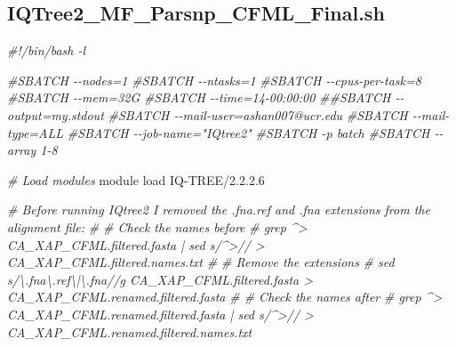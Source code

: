 \documentclass[
]{book}
\newenvironment{Shaded}{\begin{snugshade}}{\end{snugshade}}
\newcommand{\CommentTok}[1]{\textcolor[rgb]{0.56,0.35,0.01}{\textit{#1}}}
\newcommand{\ExtensionTok}[1]{#1}
\newcommand{\NormalTok}[1]{#1}
\begin{document}
\subsection{IQTree2\_MF\_Parsnp\_CFML\_Final.sh}\label{MFCFML-script}

\begin{Shaded}
\begin{Highlighting}[]
\CommentTok{\#!/bin/bash {-}l}

\CommentTok{\#SBATCH {-}{-}nodes=1}
\CommentTok{\#SBATCH {-}{-}ntasks=1}
\CommentTok{\#SBATCH {-}{-}cpus{-}per{-}task=8}
\CommentTok{\#SBATCH {-}{-}mem=32G}
\CommentTok{\#SBATCH {-}{-}time=14{-}00:00:00}
\CommentTok{\#\#SBATCH {-}{-}output=my.stdout}
\CommentTok{\#SBATCH {-}{-}mail{-}user=ashan007@ucr.edu}
\CommentTok{\#SBATCH {-}{-}mail{-}type=ALL}
\CommentTok{\#SBATCH {-}{-}job{-}name="IQtree2"}
\CommentTok{\#SBATCH {-}p batch}
\CommentTok{\#SBATCH {-}{-}array 1{-}8}


\CommentTok{\# Load modules}
\ExtensionTok{module}\NormalTok{ load IQ{-}TREE/2.2.2.6}

\CommentTok{\# Before running IQtree2 I removed the .fna.ref and .fna extensions from the alignment file:}
\CommentTok{\# \# Check the names before}
\CommentTok{\# grep \textquotesingle{}\^{}\textgreater{}\textquotesingle{} CA\_XAP\_CFML.filtered.fasta | sed \textquotesingle{}s/\^{}\textgreater{}//\textquotesingle{} \textgreater{} CA\_XAP\_CFML.filtered.names.txt }
\CommentTok{\# \# Remove the extensions}
\CommentTok{\# sed \textquotesingle{}s/\textbackslash{}.fna\textbackslash{}.ref\textbackslash{}|\textbackslash{}.fna//g\textquotesingle{} CA\_XAP\_CFML.filtered.fasta \textgreater{} CA\_XAP\_CFML.renamed.filtered.fasta}
\CommentTok{\# \# Check the names after}
\CommentTok{\# grep \textquotesingle{}\^{}\textgreater{}\textquotesingle{} CA\_XAP\_CFML.renamed.filtered.fasta | sed \textquotesingle{}s/\^{}\textgreater{}//\textquotesingle{} \textgreater{} CA\_XAP\_CFML.renamed.filtered.names.txt }


\end{Highlighting}
\end{Shaded}
\end{document}
